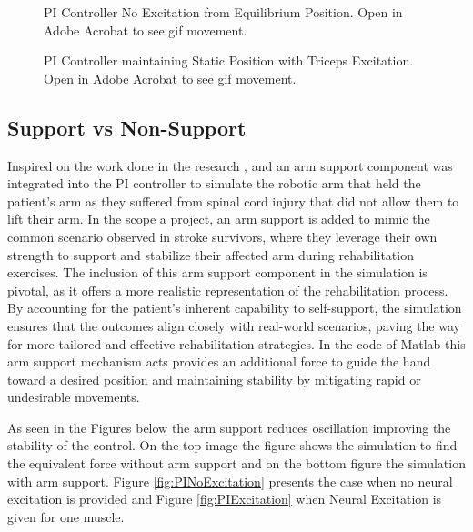 \begin{figure}[h!]
    \centering
    \caption{PI Controller No Excitation from Equilibrium Position. Open in Adobe Acrobat to see gif movement.}
    \label{gif:PICONTROLLER2}

\end{figure}

\begin{figure}[h]
    \centering
    \caption{PI Controller maintaining Static Position with Triceps Excitation. Open in Adobe Acrobat to see gif movement.}
    \label{gif:PICONTROLLER1}
\end{figure}

\subsection{Support vs Non-Support}
Inspired on the work done in the research \cite{HSAC},\cite{QSC} and \cite{RTS} an arm support component was integrated into the PI controller to simulate the robotic arm that held the patient's arm as they suffered from spinal cord injury that did not allow them to lift their arm. In the scope a project, an arm support is added to mimic the common scenario observed in stroke survivors, where they leverage their own strength to support and stabilize their affected arm during rehabilitation exercises. The inclusion of this arm support component in the simulation is pivotal, as it offers a more realistic representation of the rehabilitation process. By accounting for the patient's inherent capability to self-support, the simulation ensures that the outcomes align closely with real-world scenarios, paving the way for more tailored and effective rehabilitation strategies. In the code of Matlab this arm support mechanism acts provides an additional force to guide the hand toward a desired position and maintaining stability by mitigating rapid or undesirable movements. 

As seen in the Figures below the arm support reduces oscillation improving the stability of the control. On the top image the figure shows the simulation to find the equivalent force without arm support and on the bottom figure the simulation with arm support. Figure \ref{fig:PINoExcitation} presents the case when no neural excitation is provided and Figure \ref{fig:PIExcitation} when Neural Excitation is given for one muscle.

